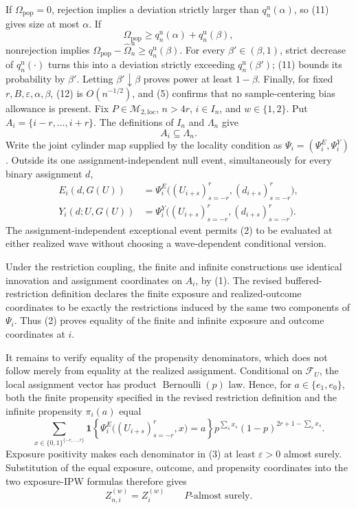 If \(\Omega_{\mathrm{pop}}=0\), rejection implies a deviation strictly larger than \(q_n^{\mathrm u}(\alpha)\), so (11) gives size at most \(\alpha\).  If
\[
 \Omega_{\mathrm{pop}}
 \ge q_n^{\mathrm u}(\alpha)+q_n^{\mathrm u}(\beta), \tag{13}
\]
nonrejection implies \(\Omega_{\mathrm{pop}}-\widehat\Omega_n^{\mathrm u}\ge q_n^{\mathrm u}(\beta)\).  For every \(\beta'\in(\beta,1)\), strict decrease of \(q_n^{\mathrm u}(\cdot)\) turns this into a deviation strictly exceeding \(q_n^{\mathrm u}(\beta')\); (11) bounds its probability by \(\beta'\).  Letting \(\beta'\downarrow\beta\) proves power at least \(1-\beta\).  Finally, for fixed \(r,B,\varepsilon,\alpha,\beta\), (12) is \(O(n^{-1/2})\), and (5) confirms that no sample-centering bias allowance is present.
Fix \(P\in\mathcal M_{2,\mathrm{loc}}\), \(n>4r\), \(i\in I_n\), and \(w\in\{1,2\}\).  Put \(A_i=\{i-r,\ldots,i+r\}\).  The definitions of \(I_n\) and \(\Lambda_n\) give
\[
 A_i\subseteq\Lambda_n. \tag{1}
\]
Write the joint cylinder map supplied by the locality condition as \(\Psi_i=(\Psi_i^E,\Psi_i^Y)\).  Outside its one assignment-independent null event, simultaneously for every binary assignment \(d\),
\[
 \begin{aligned}
 E_i(d,G(U))
 &=\Psi_i^E\bigl((U_{i+s})_{s=-r}^{r},(d_{i+s})_{s=-r}^{r}\bigr),\\
 Y_i(d;U,G(U))
 &=\Psi_i^Y\bigl((U_{i+s})_{s=-r}^{r},(d_{i+s})_{s=-r}^{r}\bigr).
 \end{aligned} \tag{2}
\]
The assignment-independent exceptional event permits (2) to be evaluated at either realized wave without choosing a wave-dependent conditional version.

Under the restriction coupling, the finite and infinite constructions use identical innovation and assignment coordinates on \(A_i\), by (1).  The revised buffered-restriction definition declares the finite exposure and realized-outcome coordinates to be exactly the restrictions induced by the same two components of \(\Psi_i\).  Thus (2) proves equality of the finite and infinite exposure and outcome coordinates at \(i\).

It remains to verify equality of the propensity denominators, which does not follow merely from equality at the realized assignment.  Conditional on \(\mathcal F_U\), the local assignment vector has product \(\operatorname{Bernoulli}(p)\) law.  Hence, for \(a\in\{e_1,e_0\}\), both the finite propensity specified in the revised restriction definition and the infinite propensity \(\pi_i(a)\) equal
\[
 \sum_{x\in\{0,1\}^{\{-r,\ldots,r\}}}
 \mathbf 1\!\left\{
  \Psi_i^E\bigl((U_{i+s})_{s=-r}^{r},x\bigr)=a
 \right\}
 p^{\sum_sx_s}(1-p)^{2r+1-\sum_sx_s}. \tag{3}
\]
Exposure positivity makes each denominator in (3) at least \(\varepsilon>0\) almost surely.  Substitution of the equal exposure, outcome, and propensity coordinates into the two exposure-IPW formulas therefore gives
\[
 Z_{n,i}^{(w)}=Z_i^{(w)}
 \qquad P\text{-almost surely}. \tag{4}
\]

